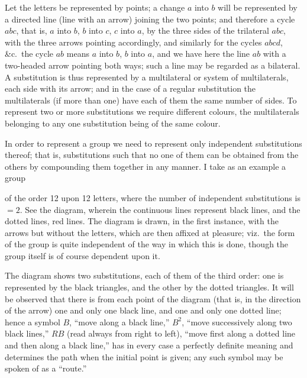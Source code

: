 \documentclass[11pt,a4paper]{book}
\begin{document}
Let the letters be represented by points; a change $a$ into $b$ will be represented by a directed line (line with an arrow) joining the two points; and therefore a cycle $abc$, that is, $a$ into $b$, $b$ into $c$, $c$ into $a$, by the three sides of the trilateral $abc$, with the three arrows pointing accordingly, and similarly for the cycles $abcd$, \&c.\ the cycle $ab$ means $a$ into $b$, $b$ into $a$, and we have here the line $ab$ with a two-headed arrow pointing both ways; such a line may be regarded as a bilateral. A substitution is thus represented by a multilateral or system of multilaterals, each side with its arrow; and in the case of a regular substitution the multilaterals (if more than one) have each of them the same number of sides. To represent two or more substitutions we require different colours, the multilaterals belonging to any one substitution being of the same colour.

In order to represent a group we need to represent only independent substitutions thereof; that is, substitutions such that no one of them can be obtained from the others by compounding them together in any manner. I take as an example a group

\clearpage
of the order 12 upon 12 letters, where the number of independent substitutions is $= 2$. See the diagram, wherein the continuous lines represent black lines, and the dotted lines, red lines. The diagram is drawn, in the first instance, with the arrows but without the letters, which are then affixed at pleasure; viz.\ the form of the group is quite independent of the way in which this is done, though the group itself is of course dependent upon it.

The diagram shows two substitutions, each of them of the third order: one is represented by the black triangles, and the other by the dotted triangles. It will be observed that there is from each point of the diagram (that is, in the direction of the arrow) one and only one black line, and one and only one dotted line; hence a symbol $B$, ``move along a black line,'' $B^2$, ``move successively along two black lines,'' $RB$ (read always from right to left), ``move first along a dotted line and then along a black line,'' has in every case a perfectly definite meaning and determines the path when the initial point is given; any such symbol may be spoken of as a ``route.''
\end{document}
